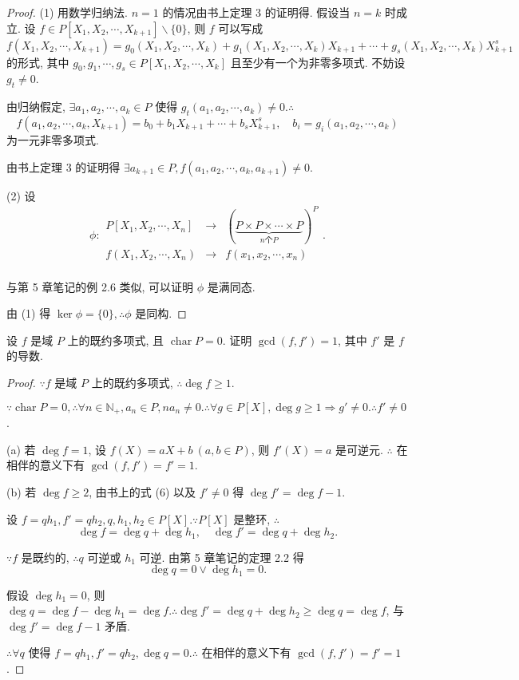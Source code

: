 \documentclass[UTF8]{ctexart}
\begin{document}
\begin{proof}
    (1) 用数学归纳法. $n=1$ 的情况由书上定理 3 的证明得. 假设当 $n=k$ 时成立. 设 $f\in P[X_1,X_2,\cdots,X_{k+1}]\backslash\{0\}$, 则 $f$ 可以写成
    \[f(X_1,X_2,\cdots,X_{k+1})=g_0(X_1,X_2,\cdots,X_k)+g_1(X_1,X_2,\cdots,X_k)X_{k+1}+\cdots+g_s(X_1,X_2,\cdots,X_k)X^s_{k+1}\]
    的形式, 其中 $g_0,g_1,\cdots,g_s\in P[X_1,X_2,\cdots,X_k]$ 且至少有一个为非零多项式. 不妨设 $g_t\neq0$.

    由归纳假定, $\exists a_1,a_2,\cdots,a_k\in P$ 使得 $g_t(a_1,a_2,\cdots,a_k)\neq0.\therefore$
    \[f(a_1,a_2,\cdots,a_k,X_{k+1})=b_0+b_1X_{k+1}+\cdots+b_sX^s_{k+1},\quad b_i=g_i(a_1,a_2,\cdots,a_k)\]
    为一元非零多项式.

    由书上定理 3 的证明得 $\exists a_{k+1}\in P,f(a_1,a_2,\cdots,a_k,a_{k+1})\neq0$.

    (2) 设
    \[\phi:\begin{array}{rcl}
        P[X_1,X_2,\cdots,X_n] & \to & (\underbrace{P\times P\times\cdots\times P}_{n\text{个}P})^P \\
        f(X_1,X_2,\cdots,X_n) & \to & f(x_1,x_2,\cdots,x_n) \\
    \end{array}.\]

    与第 5 章笔记的例 2.6 类似, 可以证明 $\phi$ 是满同态.

    由 (1) 得 $\ker\phi=\{0\},\therefore\phi$ 是同构.
\end{proof}
\addtocounter{exercise}{3}
\begin{exercise}\label{ex1.6}
    设 $f$ 是域 $P$ 上的既约多项式, 且 $\operatorname{char}P=0$. 证明 $\gcd(f,f')=1$, 其中 $f'$ 是 $f$ 的导数.
\end{exercise}
\begin{proof}
    $\because f$ 是域 $P$ 上的既约多项式, $\therefore\deg f\geq1$.

    $\because\operatorname{char}P=0,\therefore\forall n\in\mathbb{N}_+,a_n\in P,na_n\neq0.\therefore\forall g\in P[X],\deg g\geq1\Rightarrow g'\neq0.\therefore f'\neq0$.

    (a) 若 $\deg f=1$, 设 $f(X)=aX+b\ (a,b\in P)$, 则 $f'(X)=a$ 是可逆元. $\therefore$ 在相伴的意义下有 $\gcd(f,f')=f'=1$.

    (b) 若 $\deg f\geq2$, 由书上的式 (6) 以及 $f'\neq0$ 得 $\deg f'=\deg f-1$.
    
    设 $f=qh_1,f'=qh_2,q,h_1,h_2\in P[X].\because P[X]$ 是整环, $\therefore$
    \[\deg f=\deg q+\deg h_1,\quad\deg f'=\deg q+\deg h_2.\]

    $\because f$ 是既约的, $\therefore q$ 可逆或 $h_1$ 可逆. 由第 5 章笔记的定理 2.2 得
    \[\deg q=0\vee\deg h_1=0.\]

    假设 $\deg h_1=0$, 则 $\deg q=\deg f-\deg h_1=\deg f.\therefore\deg f'=\deg q+\deg h_2\geq\deg q=\deg f$, 与 $\deg f'=\deg f-1$ 矛盾.

    $\therefore\forall q$ 使得 $f=qh_1,f'=qh_2,\deg q=0.\therefore$ 在相伴的意义下有 $\gcd(f,f')=f'=1$.
\end{proof}
\end{document}
